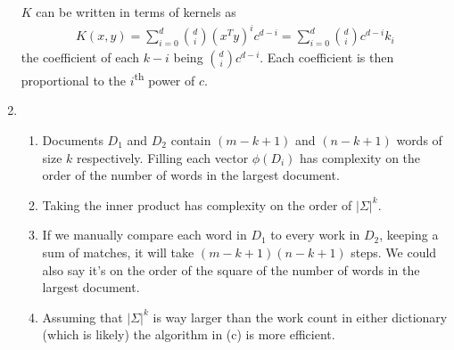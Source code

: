 \documentclass[11pt,letter]{article}
\begin{document}
\begin{enumerate}
$K$ can be written in terms of kernels as
\begin{align*}
    K(x,y) = \sum_{i=0}^d \binom{d}{i} (x^Ty)^{i}c^{d-i} = \sum_{i=0}^d \binom{d}{i}c^{d-i}k_i
\end{align*}
the coefficient of each $k-i$ being $\binom{d}{i}c^{d-i}$. Each coefficient is then proportional to the $i$\textsuperscript{th} power of $c$.

\item \begin{enumerate}
    \item Documents $D_1$ and $D_2$ contain $(m-k+1)$ and $(n-k+1)$ words of size $k$ respectively. Filling each vector $\phi(D_i)$ has complexity on the order of the number of words in the largest document.
    \item Taking the inner product has complexity on the order of $\vert \Sigma \vert^k$.
    \item If we manually compare each word in $D_1$ to every work in $D_2$, keeping a sum of matches, it will take $(m-k+1)(n-k+1)$ steps. We could also say it's on the order of the square of the number of words in the largest document.
    \item Assuming that $\vert \Sigma \vert^k$ is way larger than the work count in either dictionary (which is likely) the algorithm in (c) is more efficient.
    \end{enumerate}
\end{enumerate}
\end{document}
